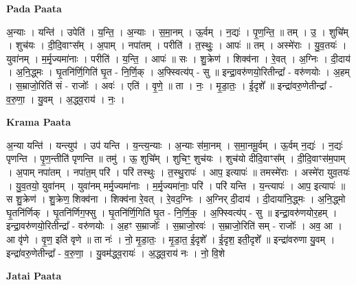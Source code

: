 \documentclass[17pt]{extarticle}
\begin{document}
\textbf{Pada Paata} \newline

अ॒न्याः । यन्ति॑ । उपेति॑ । य॒न्ति॒ । अ॒न्याः । स॒मा॒नम् । ऊ॒र्वम् । न॒द्यः॑ । पृ॒ण॒न्ति॒ ॥ तम् । उ॒ । शुचि᳚म् । शुच॑यः । दी॒दि॒वाꣳस᳚म् । अ॒पाम् । नपा॑तम् । परीति॑ । त॒स्थुः॒ । आपः॑ ॥ तम् । अस्मे॑राः । यु॒व॒तयः॑ । युवा॑नम् । म॒र्मृ॒ज्यमा॑नाः । परीति॑ । य॒न्ति॒ । आपः॑ ॥ सः । शु॒क्रेण॑ । शिक्व॑ना । रे॒वत् । अ॒ग्निः । दी॒दाय॑ । अ॒नि॒द्ध्मः । घृ॒तनि॑र्णि॒गिति॑ घृ॒त - नि॒र्णि॒क् । अ॒फ्स्वित्य॑प् - सु ॥ इन्द्रा॒वरु॑णयो॒रितीन्द्रा᳚ - वरु॑णयोः । अ॒हम् । स॒म्राजो॒रिति॑ सं - राजोः᳚ । अवः॑ । एति॑ । वृ॒णे॒ ॥ ता । नः॒ । मृ॒डा॒तः॒ । ई॒दृशे᳚ ॥ इन्द्रा॑वरु॒णेतीन्द्रा᳚ - व॒रु॒णा॒ । यु॒वम् । अ॒द्ध्व॒राय॑ । नः॒ ।  \newline


\textbf{Krama Paata} \newline

अ॒न्या यन्ति॑ । यन्त्युप॑ । उप॑ यन्ति । य॒न्त्य॒न्याः । अ॒न्याः स॑मा॒नम् । स॒मा॒नमू॒र्वम् । ऊ॒र्वम् न॒द्यः॑ । न॒द्यः॑ पृणन्ति । पृ॒ण॒न्तीति॑ पृणन्ति ॥ तमु॑ । ऊ॒ शुचि᳚म् । शुचिꣳ॒॒ शुच॑यः । शुच॑यो दीदि॒वाꣳस᳚म् । दी॒दि॒वाꣳस॑म॒पाम् । अ॒पाम् नपा॑तम् । नपा॑त॒म् परि॑ । परि॑ तस्थुः । त॒स्थु॒रापः॑ । आप॒ इत्यापः॑ ॥ तमस्मे॑राः । अस्मे॑रा युव॒तयः॑ । यु॒व॒तयो॒ युवा॑नम् । युवा॑नम् मर्मृ॒ज्यमा॑नाः । म॒र्मृ॒ज्यमा॑नाः॒ परि॑ । परि॑ यन्ति । य॒न्त्यापः॑ । आप॒ इत्यापः॑ ॥ स शु॒क्रेण॑ । शु॒क्रेण॒ शिक्व॑ना । शिक्व॑ना रे॒वत् । रे॒वद॒ग्निः । अ॒ग्निर् दी॒दाय॑ । दी॒दाया॑नि॒द्ध्मः । अ॒नि॒द्ध्मो घृ॒तनि॑र्णिक् । घृ॒तनि॑र्णिग॒फ्सु । घृ॒तनि॑र्णि॒गिति॑ घृ॒त - नि॒र्णि॒क्॒ । अ॒फ्स्वित्य॑प् - सु ॥ इन्द्रा॒वरु॑णयोर॒हम् । इन्द्रा॒वरु॑णयो॒रितीन्द्रा᳚ - वरु॑णयोः । अ॒हꣳ स॒म्राजोः᳚ । स॒म्राजो॒रवः॑ । स॒म्राजो॒रिति॑ सम् - राजोः᳚ । अव॒ आ । आ वृ॑णे । वृ॒ण॒ इति॑ वृणे ॥ ता नः॑ । नो॒ मृ॒डा॒तः॒ । मृ॒डा॒त॒ ई॒दृशे᳚ । ई॒दृश॒ इती॒दृशे᳚ ॥ इन्द्रा॑वरुणा यु॒वम् । इन्द्रा॑वरु॒णेतीन्द्रा᳚ - व॒रु॒णा॒ । यु॒वम॑द्ध्व॒रायः॑ । अ॒द्ध्व॒राय॑ नः । नो॒ वि॒शे \newline

\textbf{Jatai Paata} \newline
\end{document}
